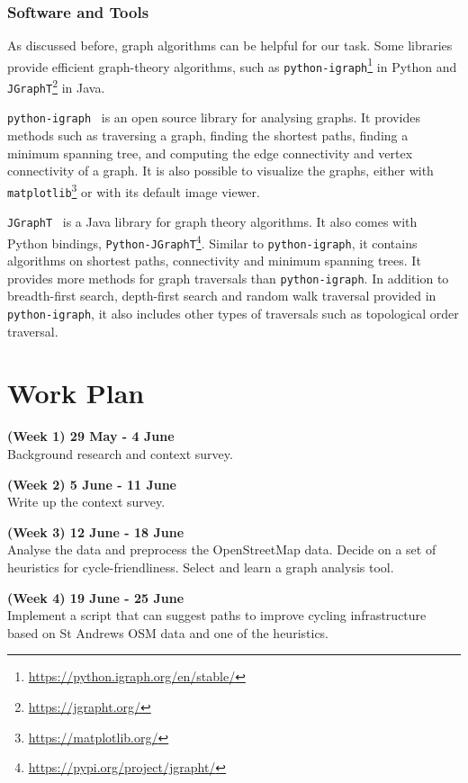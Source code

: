 \documentclass[12pt,a4paper]{report}
\begin{document}
\subsection*{Software and Tools}
As discussed before, graph algorithms can be helpful for our task. Some libraries provide efficient graph-theory algorithms, such as \texttt{python-igraph}\footnote{\url{https://python.igraph.org/en/stable/}} in Python and \texttt{JGraphT}\footnote{\url{https://jgrapht.org/}} in Java.

\texttt{python-igraph}~\cite{csardi2005} is an open source library for analysing graphs. It provides methods such as traversing a graph, finding the shortest paths, finding a minimum spanning tree, and computing the edge connectivity and vertex connectivity of a graph. It is also possible to visualize the graphs, either with \texttt{matplotlib}\footnote{\url{https://matplotlib.org/}} or with its default image viewer.

\texttt{JGraphT}~\cite{jgrapht} is a Java library for graph theory algorithms. It also comes with Python bindings, \texttt{Python-JGraphT}\footnote{\url{https://pypi.org/project/jgrapht/}}. Similar to \texttt{python-igraph}, it contains algorithms on shortest paths, connectivity and minimum spanning trees. It provides more methods for graph traversals than \texttt{python-igraph}. In addition to breadth-first search, depth-first search and random walk traversal provided in \texttt{python-igraph}, it also includes other types of traversals such as topological order traversal.




\chapter*{Work Plan}
\textbf{(Week 1) 29 May - 4 June}\\
Background research and context survey.

\textbf{(Week 2) 5 June - 11 June}\\
Write up the context survey.

\textbf{(Week 3) 12 June - 18 June}\\
Analyse the data and preprocess the OpenStreetMap data. Decide on a set of heuristics for cycle-friendliness. Select and learn a graph analysis tool.

\textbf{(Week 4) 19 June - 25 June}\\
Implement a script that can suggest paths to improve cycling infrastructure based on St Andrews OSM data and one of the heuristics.
\end{document}

